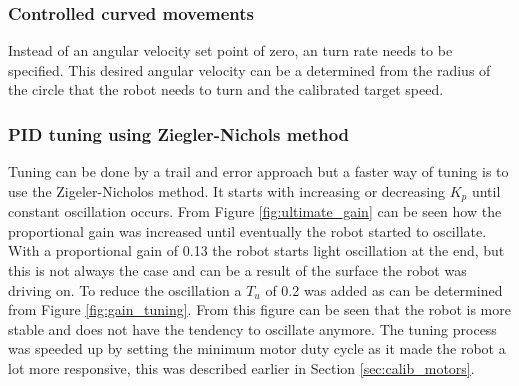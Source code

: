 \subsubsection{Controlled curved movements} 

Instead of an angular velocity set point of zero, an turn rate needs to be specified.
This desired angular velocity can be a determined from the radius of the circle that the robot needs to turn and the calibrated target speed.

\subsubsection{PID tuning using Ziegler-Nichols method}


Tuning can be done by a trail and error approach but a faster way of tuning is to use the Zigeler-Nicholos method.
It starts with increasing or decreasing $K_{p}$ until constant oscillation occurs.
From Figure \ref{fig:ultimate_gain} can be seen how the proportional gain was increased until eventually the robot started to oscillate.
With a proportional gain of 0.13 the robot starts light oscillation at the end, but this is not always the case and can be a result of the surface the robot was driving on.
To reduce the oscillation a $T_{u}$ of 0.2 was added as can be determined from Figure \ref{fig:gain_tuning}.
From this figure can be seen that the robot is more stable and does not have the tendency to oscillate anymore.
The tuning process was speeded up by setting the minimum motor duty cycle as it made the robot a lot more responsive, this was described earlier in Section \ref{sec:calib_motors}.


